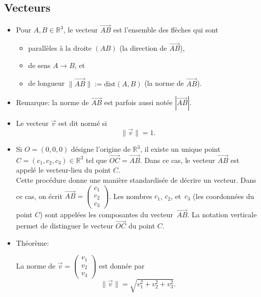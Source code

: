 \documentclass[12pt,a4paper]{article}
\newcommand{\vect}{\overrightarrow}
\begin{document}
\subsection{Vecteurs}
\begin{itemize}[label=$\bullet$]
\item Pour $A,B\in\mathbb{R}^3$, le \colorbox{def!40}{vecteur} $\vect{AB}$ est l'ensemble des flèches qui sont
\begin{itemize}[label=$\circ$]
\item parallèles à la droite $(AB)$ (la \colorbox{def!40}{direction} de $\vect{AB}$),
\item de \colorbox{def!40}{sens} $A\rightarrow B$, et 
\item de longueur $\|\vect{AB}\|:=\mathrm{dist}(A,B)$ (la \colorbox{def!40}{norme} de $\vect{AB}$).
\end{itemize}
\item \textcolor{expl!60!black}{Remarque:} la norme de $\vect{AB}$ est parfois aussi notée $|\vect{AB}|$.
\item Le vecteur $\vect{v}$ est dit \colorbox{def!40}{normé} si $$\|\vect{v}\|=1. $$
\item Si $O = (0,0,0)$ désigne l'origine de $\mathbb{R}^3$, il existe un unique point \\ $C = (c_1,c_2,c_3)\in\mathbb{R}^3$ tel que $\vect{OC}=\vect{AB}$. Dans ce cas, le vecteur $\vect{AB}$ est appelé le \colorbox{def!40}{vecteur-lieu} du point $C$.\\
Cette procédure donne une manière standardisée de décrire un vecteur. Dans ce cas, on écrit $\vect{AB}=\begin{pmatrix}
c_1\\c_2\\c_3
\end{pmatrix}$. Les nombres $c_1$, $c_2$, et~$c_3$ (les coordonnées du point $C$) sont appelées les \colorbox{def!40}{composantes} du vecteur~$\vect{AB}$. La notation verticale permet de distinguer le vecteur $\vect{OC}$ du point $C$.
\item \textcolor{th!60!black}{Théorème:} 

La norme de $\vect{v}=\begin{pmatrix}
v_1\\v_2\\v_3
\end{pmatrix}$ est donnée par $$\|\vect{v}\|=\sqrt{v_1^2+v_2^2+v_3^2}.$$


\end{itemize}
\end{document}

